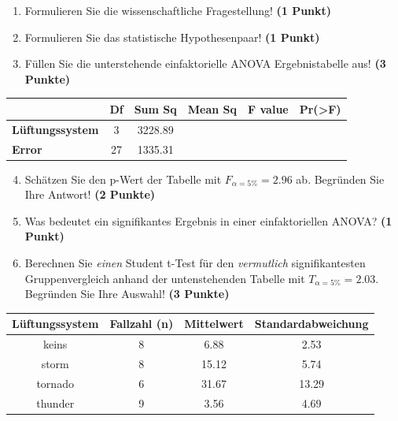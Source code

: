 \documentclass[a4paper, 9pt]{scrartcl}\usepackage[]{graphicx}\usepackage[]{xcolor}
\newenvironment{knitrout}{}{} %
\begin{document}
\begin{enumerate}
  \item Formulieren Sie die wissenschaftliche Fragestellung! \textbf{(1 Punkt)}
  \item Formulieren Sie das statistische Hypothesenpaar! \textbf{(1 Punkt)}
\item Füllen Sie die unterstehende einfaktorielle ANOVA Ergebnistabelle aus! \textbf{(3 Punkte)}
\end{enumerate}

\vspace{1Ex}

\begin{center}
  \Large
  \begin{tabular}{lccccp{3cm}}
\toprule
     & \textbf{Df} & \textbf{Sum Sq} & \textbf{Mean Sq} & \textbf{F value} & \textbf{Pr(>F)} \strut\\
    \midrule
   \textbf{Lüftungssystem}  & 3 & 3228.89 &  &  &  \strut\\
   \textbf{Error}  & 27 & 1335.31 &  &  &  \strut\\
\bottomrule
  \end{tabular}
\end{center}

\vspace{1Ex}

\begin{enumerate}
  \setcounter{enumi}{3}
\item Schätzen Sie den p-Wert der Tabelle mit $F_{\alpha = 5\%} = 2.96$ ab. Begründen Sie Ihre Antwort! \textbf{(2 Punkte)}
\item Was bedeutet ein signifikantes Ergebnis in einer einfaktoriellen ANOVA? \textbf{(1 Punkt)}
\item Berechnen Sie \textit{einen} Student t-Test für den \textit{vermutlich} signifikantesten Gruppenvergleich anhand der untenstehenden Tabelle mit $T_{\alpha = 5\%} = 2.03$. Begründen Sie Ihre Auswahl! \textbf{(3 Punkte)}
\end{enumerate}


\begin{knitrout}
\color{fgcolor}\begin{table}[!h]
\centering\begingroup\fontsize{11}{13}\selectfont

\begin{tabular}{cccc}
\toprule
\textbf{Lüftungssystem} & \textbf{Fallzahl (n)} & \textbf{Mittelwert} & \textbf{Standardabweichung}\\
\midrule
keins & 8 & 6.88 & 2.53\\
storm & 8 & 15.12 & 5.74\\
tornado & 6 & 31.67 & 13.29\\
thunder & 9 & 3.56 & 4.69\\
\bottomrule
\end{tabular}
\endgroup{}
\end{table}

\end{knitrout}
\end{document}
